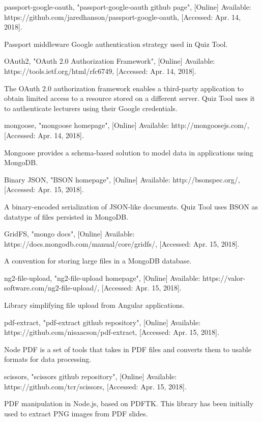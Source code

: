 \documentclass[11pt,a4paper]{report}
\begin{document}
\begin{thebibliography}{1}
 passport-google-oauth, "passport-google-oauth github page", [Online] Available: https://github.com/jaredhanson/passport-google-oauth, [Accessed: Apr. 14, 2018].

  Passport middleware Google authentication strategy used in Quiz Tool.

 OAuth2, "OAuth 2.0 Authorization Framework", [Online] Available: https://tools.ietf.org/html/rfc6749, [Accessed: Apr. 14, 2018].

  The OAuth 2.0 authorization framework enables a third-party application to obtain limited access to a resource stored on a
  different server. Quiz Tool uses it to authenticate lecturers using their Google credentials.

 mongoose, "mongoose homepage", [Online] Available: http://mongoosejs.com/, [Accessed: Apr. 14, 2018].

    Mongoose provides a schema-based solution to model data in applications using MongoDB.

 Binary JSON, "BSON homepage", [Online] Available: http://bsonspec.org/, [Accessed: Apr. 15, 2018].

    A binary-encoded serialization of JSON-like documents. Quiz Tool uses BSON as datatype of files persisted in MongoDB.

 GridFS, "mongo docs", [Online] Available: https://docs.mongodb.com/manual/core/gridfs/, [Accessed: Apr. 15, 2018].

    A convention for storing large files in a MongoDB database.

 ng2-file-upload, "ng2-file-upload homepage", [Online] Available: https://valor-software.com/ng2-file-upload/, [Accessed: Apr. 15, 2018].

    Library simplifying file upload from Angular applications.

 pdf-extract, "pdf-extract github repository", [Online] Available: https://github.com/nisaacson/pdf-extract, [Accessed: Apr. 15, 2018].

    Node PDF is a set of tools that takes in PDF files and converts them to usable formats for data processing.

 scissors, "scissors github repository", [Online] Available: https://github.com/tcr/scissors, [Accessed: Apr. 15, 2018].

    PDF manipulation in Node.js, based on PDFTK. This library has been initially used to extract PNG images from PDF slides.

\end{thebibliography}
\end{document}
